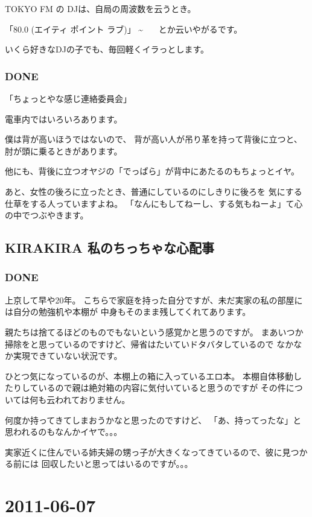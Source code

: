 \documentclass[11pt]{article}
\begin{document}
TOKYO FM の DJは、自局の周波数を云うとき。

「80.0 (エイティ ポイント ラブ)」
                          \~{}~~~
とか云いやがるです。

いくら好きなDJの子でも、毎回軽くイラっとします。
\subsubsection{\textbf{DONE}}
\label{sec-112_1_2}

「ちょっとやな感じ連絡委員会」

電車内ではいろいろあります。

僕は背が高いほうではないので、
背が高い人が吊り革を持って背後に立つと、肘が頭に乗るときがあります。

他にも、背後に立つオヤジの「でっぱら」が背中にあたるのもちょっとイヤ。

あと、女性の後ろに立ったとき、普通にしているのにしきりに後ろを
気にする仕草をする人っていますよね。
「なんにもしてねーし、する気もねーよ」て心の中でつぶやきます。
\subsection{KIRAKIRA 私のちっちゃな心配事}
\label{sec-112_2}
\subsubsection{\textbf{DONE}}
\label{sec-112_2_1}

上京して早や20年。
こちらで家庭を持った自分ですが、未だ実家の私の部屋には自分の勉強机や本棚が
中身もそのまま残してくれてあります。

親たちは捨てるほどのものでもないという感覚かと思うのですが。
まあいつか掃除をと思っているのですけど、帰省はたいていドタバタしているので
なかなか実現できていない状況です。

ひとつ気になっているのが、本棚上の箱に入っているエロ本。
本棚自体移動したりしているので親は絶対箱の内容に気付いていると思うのですが
その件については何も云われておりません。

何度か持ってきてしまおうかなと思ったのですけど、
「あ、持ってったな」と思われるのもなんかイヤで。。。

実家近くに住んでいる姉夫婦の甥っ子が大きくなってきているので、彼に見つかる前には
回収したいと思ってはいるのですが。。。
\section{2011-06-07}
\label{sec-113}
\end{document}
